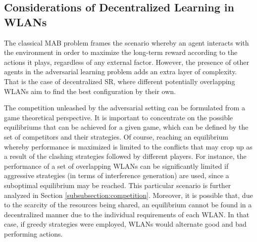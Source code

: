 \documentclass[preprint,12pt]{elsarticle}
\begin{document}
\subsection{Considerations of Decentralized Learning in WLANs}
\label{subsection:considerations}
%
The classical MAB problem frames the scenario whereby an agent interacts with the environment in order to maximize the long-term reward according to the actions it plays, regardless of any external factor. However, the presence of other agents in the adversarial learning problem adds an extra layer of complexity. That is the case of decentralized SR, where different potentially overlapping WLANs aim to find the best configuration by their own. 

The competition unleashed by the adversarial setting can be formulated from a game theoretical perspective. It is important to concentrate on the possible equilibriums that can be achieved for a given game, which can be defined by the set of competitors and their strategies. Of course, reaching an equilibrium whereby performance is maximized is limited to the conflicts that may crop up as a result of the clashing strategies followed by different players. For instance, the performance of a set of overlapping WLANs can be significantly limited if aggressive strategies (in terms of interference generation) are used, since a suboptimal equilibrium may be reached. This particular scenario is further analyzed in Section \ref{subsubsection:competition}. Moreover, it is possible that, due to the scarcity of the resources being shared, an equilibrium cannot be found in a decentralized manner due to the individual requirements of each WLAN. In that case, if greedy strategies were employed, WLANs would alternate good and bad performing actions.  
\end{document}
